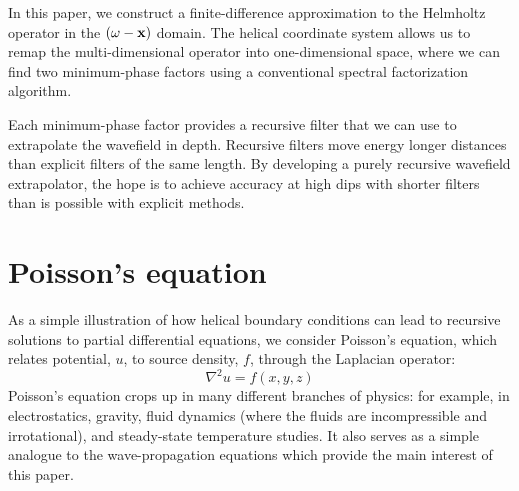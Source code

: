\par
In this paper, we construct a finite-difference approximation to the
Helmholtz operator in the $(\omega-{\bf x})$ domain. The helical
coordinate system allows us to remap the multi-dimensional operator
into one-dimensional space, where we can find two minimum-phase
factors using a conventional spectral factorization algorithm.

\par
Each minimum-phase factor provides a recursive filter that we can use
to extrapolate the wavefield in depth.
Recursive filters move energy longer distances than explicit filters
of the same length. By developing a purely recursive wavefield
extrapolator, the hope is to achieve accuracy at high dips with
shorter filters than is possible with explicit methods.

\section{Poisson's equation}
As a simple illustration of how helical boundary conditions can lead
to recursive solutions to partial differential equations, we consider
Poisson's equation, which relates potential, $u$, to source density,
$f$, through the Laplacian operator:
\begin{equation}
\nabla^2 u = f(x,y,z)
\end{equation}
Poisson's equation crops up in many different branches of physics: for
example, in electrostatics, gravity, fluid dynamics (where the fluids
are incompressible and irrotational), and steady-state temperature
studies.  It also serves as a simple analogue to the wave-propagation
equations which provide the main interest of this paper.

